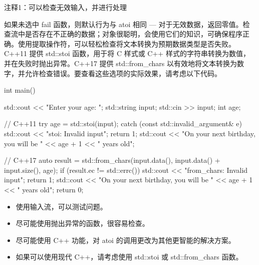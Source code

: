 {\footnotesize
注释1：可以检查无效输入，并进行处理
}

如果未选中 fail 函数，则默认行为与 atoi 相同 — 对于无效数据，返回零值。检查流中是否存在不正确的数据；对象很聪明，会使用它们的知识，可确保程序正确。使用提取操作符，可以轻松检查将文本转换为预期数据类型是否失败。C++11 提供 std::stoi 函数，用于将 C 样式或 C++ 样式的字符串转换为数值，并在失败时抛出异常。C++17 提供 std::from\_chars 以有效地将文本转换为数字，并允许检查错误。要查看这些选项的实际效果，请考虑以下代码。


\begin{cpp}
int main() {
  std::cout << "Enter your age: ";
  std::string input;
  std::cin >> input;
  int age;

  // C++11
  try {
    age = std::stoi(input);
  } catch (const std::invalid_argument& e) {
    std::cout << "stoi: Invalid input\n";
    return 1;
  }
  std::cout << "On your next birthday, you will be " << age + 1 << " years old\n";

  // C++17
  auto result = std::from_chars(input.data(), input.data() + input.size(), age);
  if (result.ec != std::errc()) {
    std::cout << "from_chars: Invalid input\n";
    return 1;
  }
  std::cout << "On your next birthday, you will be " << age + 1 << " years old\n";
  return 0;
}
\end{cpp}


\begin{itemize}
\item
使用输入流，可以测试问题。

\item
尽可能使用抛出异常的函数，很容易检查。

\item
尽可能使用 C++ 功能，对 atoi 的调用更改为其他更智能的解决方案。

\item
如果可以使用现代 C++，请考虑使用 std::stoi 或 std::from\_chars 函数。
\end{itemize}





















